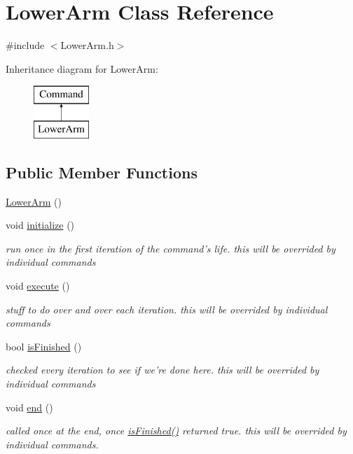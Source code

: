 \hypertarget{classLowerArm}{\section{Lower\-Arm Class Reference}
\label{classLowerArm}
}


{\ttfamily \#include $<$Lower\-Arm.\-h$>$}

Inheritance diagram for Lower\-Arm\-:\begin{figure}[H]
\begin{center}
\leavevmode
\includegraphics[height=2.000000cm]{classLowerArm}
\end{center}
\end{figure}
\subsection*{Public Member Functions}
\begin{DoxyCompactItemize}
\item 
\hyperlink{classLowerArm_a94252e4c3f22881def50fb2415649f21}{Lower\-Arm} ()
\item 
void \hyperlink{classLowerArm_a4fe99e8f0cdb3526e3847823f69a60b8}{initialize} ()
\begin{DoxyCompactList}\small\item\em run once in the first iteration of the command's life. this will be overrided by individual commands \end{DoxyCompactList}\item 
void \hyperlink{classLowerArm_aca65c2ae64b1ff601213b1ed38ddf8b0}{execute} ()
\begin{DoxyCompactList}\small\item\em stuff to do over and over each iteration. this will be overrided by individual commands \end{DoxyCompactList}\item 
bool \hyperlink{classLowerArm_ad7bb0aadf698f341d737ccefdb015ce2}{is\-Finished} ()
\begin{DoxyCompactList}\small\item\em checked every iteration to see if we're done here. this will be overrided by individual commands \end{DoxyCompactList}\item 
void \hyperlink{classLowerArm_aa46179794b13132a2a353f24c785db37}{end} ()
\begin{DoxyCompactList}\small\item\em called once at the end, once \hyperlink{classLowerArm_ad7bb0aadf698f341d737ccefdb015ce2}{is\-Finished()} returned true. this will be overrided by individual commands. \end{DoxyCompactList}\end{DoxyCompactItemize}
